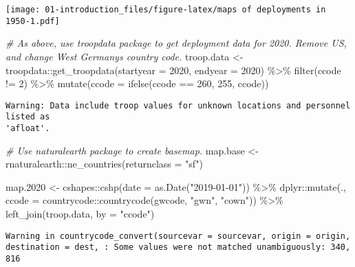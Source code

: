 \documentclass[
]{book}
\newenvironment{Shaded}{\begin{snugshade}}{\end{snugshade}}
\newcommand{\AttributeTok}[1]{\textcolor[rgb]{0.77,0.63,0.00}{#1}}
\newcommand{\CommentTok}[1]{\textcolor[rgb]{0.56,0.35,0.01}{\textit{#1}}}
\newcommand{\DecValTok}[1]{\textcolor[rgb]{0.00,0.00,0.81}{#1}}
\newcommand{\FloatTok}[1]{\textcolor[rgb]{0.00,0.00,0.81}{#1}}
\newcommand{\FunctionTok}[1]{\textcolor[rgb]{0.00,0.00,0.00}{#1}}
\newcommand{\NormalTok}[1]{#1}
\newcommand{\OtherTok}[1]{\textcolor[rgb]{0.56,0.35,0.01}{#1}}
\newcommand{\SpecialCharTok}[1]{\textcolor[rgb]{0.00,0.00,0.00}{#1}}
\newcommand{\StringTok}[1]{\textcolor[rgb]{0.31,0.60,0.02}{#1}}
\theoremstyle{definition}
\theoremstyle{definition}
\theoremstyle{definition}
\theoremstyle{definition}
\theoremstyle{remark}
\begin{document}
\texttt{[image: 01-introduction\_files/figure-latex/maps of deployments in 1950-1.pdf]}

\begin{Shaded}
\begin{Highlighting}[]
\CommentTok{\# As above, use troopdata package to get deployment data for 2020. Remove US, and change West Germany\textquotesingle{}s country code.}
\NormalTok{troop.data }\OtherTok{\textless{}{-}}\NormalTok{ troopdata}\SpecialCharTok{::}\FunctionTok{get\_troopdata}\NormalTok{(}\AttributeTok{startyear =} \DecValTok{2020}\NormalTok{, }\AttributeTok{endyear =} \DecValTok{2020}\NormalTok{) }\SpecialCharTok{\%\textgreater{}\%} 
  \FunctionTok{filter}\NormalTok{(ccode }\SpecialCharTok{!=} \DecValTok{2}\NormalTok{) }\SpecialCharTok{\%\textgreater{}\%} 
  \FunctionTok{mutate}\NormalTok{(}\AttributeTok{ccode =} \FunctionTok{ifelse}\NormalTok{(ccode }\SpecialCharTok{==} \DecValTok{260}\NormalTok{, }\DecValTok{255}\NormalTok{, ccode))}
\end{Highlighting}
\end{Shaded}

\begin{verbatim}
Warning: Data include troop values for unknown locations and personnel listed as
'afloat'.
\end{verbatim}

\begin{Shaded}
\begin{Highlighting}[]
\CommentTok{\# Use naturalearth package to create basemap.}
\NormalTok{map.base }\OtherTok{\textless{}{-}}\NormalTok{ rnaturalearth}\SpecialCharTok{::}\FunctionTok{ne\_countries}\NormalTok{(}\AttributeTok{returnclass =} \StringTok{"sf"}\NormalTok{)}

\NormalTok{map}\FloatTok{.2020} \OtherTok{\textless{}{-}}\NormalTok{ cshapes}\SpecialCharTok{::}\FunctionTok{cshp}\NormalTok{(}\AttributeTok{date =} \FunctionTok{as.Date}\NormalTok{(}\StringTok{"2019{-}01{-}01"}\NormalTok{)) }\SpecialCharTok{\%\textgreater{}\%}  
\NormalTok{  dplyr}\SpecialCharTok{::}\FunctionTok{mutate}\NormalTok{(., }\AttributeTok{ccode =}\NormalTok{ countrycode}\SpecialCharTok{::}\FunctionTok{countrycode}\NormalTok{(gwcode, }\StringTok{"gwn"}\NormalTok{, }\StringTok{"cown"}\NormalTok{)) }\SpecialCharTok{\%\textgreater{}\%} 
  \FunctionTok{left\_join}\NormalTok{(troop.data, }\AttributeTok{by =} \StringTok{"ccode"}\NormalTok{)}
\end{Highlighting}
\end{Shaded}

\begin{verbatim}
Warning in countrycode_convert(sourcevar = sourcevar, origin = origin, destination = dest, : Some values were not matched unambiguously: 340, 816
\end{verbatim}
\end{document}
